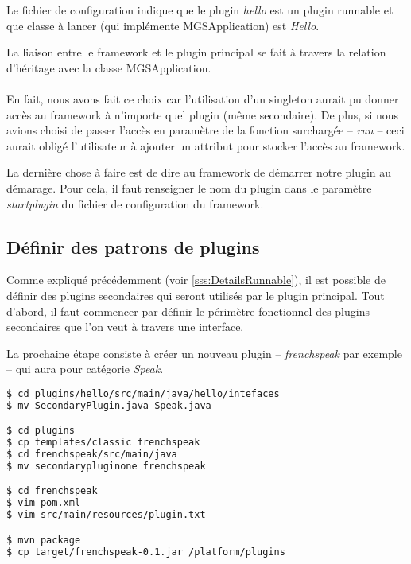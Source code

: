 \documentclass[12pt,a4paper]{article}
\begin{document}
Le fichier de configuration indique que le plugin \emph{hello} est un plugin 
runnable et que classe à lancer (qui implémente MGSApplication) est \emph{Hello}.

\lstset{language=bash,caption=Hello plugin configuration}


La liaison entre le framework et le plugin principal se fait à travers la relation 
d'héritage avec la classe MGSApplication. 
\\\\
En fait, nous avons fait ce choix car l'utilisation d'un singleton aurait pu 
donner accès au framework à n'importe quel plugin (même secondaire). De plus, si 
nous avions choisi de passer l'accès en paramètre de la fonction surchargée -- 
\emph{run} -- ceci aurait obligé l'utilisateur à ajouter un attribut pour stocker 
l'accès au framework.

\lstset{language=java,caption=Hello plugin main class}


La dernière chose à faire est de dire au framework de démarrer notre plugin au 
démarage. Pour cela, il faut renseigner le nom du plugin dans le paramètre 
\emph{startplugin} du fichier de configuration du framework.

\subsection{Définir des patrons de plugins}
Comme expliqué précédemment (voir \ref{sss:DetailsRunnable}), il est possible de 
définir des plugins secondaires qui seront utilisés par le plugin principal. 
Tout d'abord, il faut commencer par définir le périmètre fonctionnel des 
plugins secondaires que l'on veut à travers une interface.

\lstset{language=java,caption=Speak interface for Hello plugin}


La prochaine étape consiste à créer un nouveau plugin -- \emph{frenchspeak} par 
exemple -- qui aura pour catégorie \emph{Speak}.

\begin{lstlisting}[language=bash,caption=Création du plugin secondaire frenchspeak]
$ cd plugins/hello/src/main/java/hello/intefaces
$ mv SecondaryPlugin.java Speak.java

$ cd plugins
$ cp templates/classic frenchspeak
$ cd frenchspeak/src/main/java
$ mv secondarypluginone frenchspeak

$ cd frenchspeak
$ vim pom.xml
$ vim src/main/resources/plugin.txt

$ mvn package
$ cp target/frenchspeak-0.1.jar /platform/plugins
\end{lstlisting}
\end{document}
